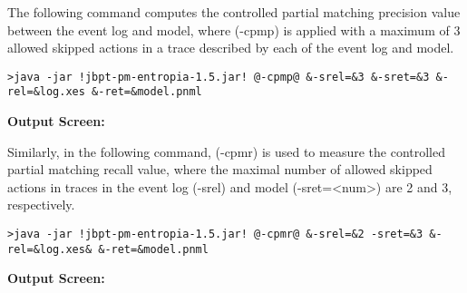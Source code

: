 The following command computes the controlled partial matching precision value between the event log and model, where (\textcolor{darkcandyapplered}{\footnotesize\ttfamily-cpmp}) is applied with a maximum of 3 allowed skipped actions in a trace described by each of the event log and model.
\begin{lstlisting}[style=CL]
>java -jar !jbpt-pm-entropia-1.5.jar! @-cpmp@ &-srel=&3 &-sret=&3 &-rel=&log.xes &-ret=&model.pnml
\end{lstlisting}
\textbf{Output Screen:}%


Similarly, in the following command, (\textcolor{darkcandyapplered}{\footnotesize\ttfamily-cpmr}) is used to measure the  controlled partial matching recall value, where the maximal number of allowed skipped actions in traces in the event log (\textcolor{ao}{\footnotesize\ttfamily-srel}) and model (\textcolor{ao}{\footnotesize\ttfamily-sret=<num>}) are 2 and 3, respectively.
\begin{lstlisting}[style=CL]
>java -jar !jbpt-pm-entropia-1.5.jar! @-cpmr@ &-srel=&2 -sret=&3 &-rel=&log.xes& &-ret=&model.pnml
\end{lstlisting}
\textbf{Output Screen:}%
